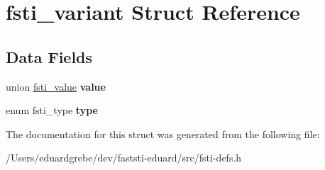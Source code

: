 \hypertarget{structfsti__variant}{}\section{fsti\+\_\+variant Struct Reference}
\label{structfsti__variant}
\subsection*{Data Fields}
\begin{DoxyCompactItemize}
\item 
\mbox{\label{structfsti__variant_a0cc10d0720f34ac052f489c080762b30}} 
union \mbox{\hyperlink{unionfsti__value}{fsti\+\_\+value}} {\bfseries value}
\item 
\mbox{\label{structfsti__variant_a9354fcc6fb77572e22ed830cdd4c99e2}} 
enum fsti\+\_\+type {\bfseries type}
\end{DoxyCompactItemize}


The documentation for this struct was generated from the following file\+:\begin{DoxyCompactItemize}
\item 
/\+Users/eduardgrebe/dev/faststi-\/eduard/src/fsti-\/defs.\+h\end{DoxyCompactItemize}
